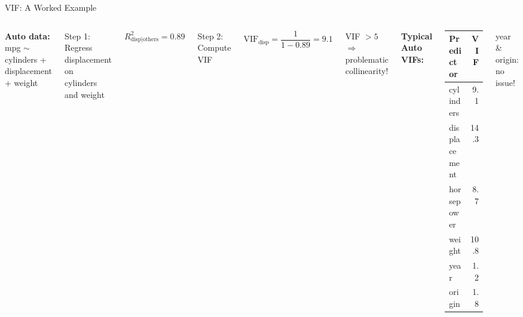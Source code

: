 \documentclass[aspectratio=169, 11pt]{beamer}
\begin{document}
\begin{frame}{VIF: A Worked Example}
\begin{columns}
\textbf{Auto data:} mpg $\sim$ cylinders + displacement + weight

\vspace{0.3em}
Step 1: Regress displacement on\\
cylinders and weight

$R^2_{\text{disp}|\text{others}} = 0.89$

\vspace{0.3em}
Step 2: Compute VIF

$$\text{VIF}_{\text{disp}} = \frac{1}{1 - 0.89} = 9.1$$

\vspace{0.3em}
\textcolor{softred}{VIF $> 5$ $\Rightarrow$ problematic collinearity!}

\textbf{Typical Auto VIFs:}

\begin{tabular}{lr}
\toprule
Predictor & VIF \\
\midrule
cylinders & 9.1 \\
displacement & \textcolor{softred}{14.3} \\
horsepower & 8.7 \\
weight & \textcolor{softred}{10.8} \\
year & 1.2 \\
origin & 1.8 \\
\bottomrule
\end{tabular}

\vspace{0.2em}
\footnotesize year \& origin: no issue!
\end{columns}
\end{frame}
\end{document}
